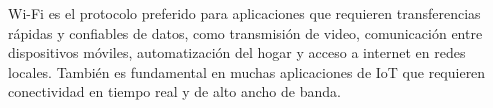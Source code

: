 Wi-Fi es el protocolo preferido para aplicaciones que requieren transferencias rápidas y confiables de datos, como transmisión de video, comunicación entre dispositivos móviles, automatización del hogar y acceso a internet en redes locales. También es fundamental en muchas aplicaciones de IoT que requieren conectividad en tiempo real y de alto ancho de banda.